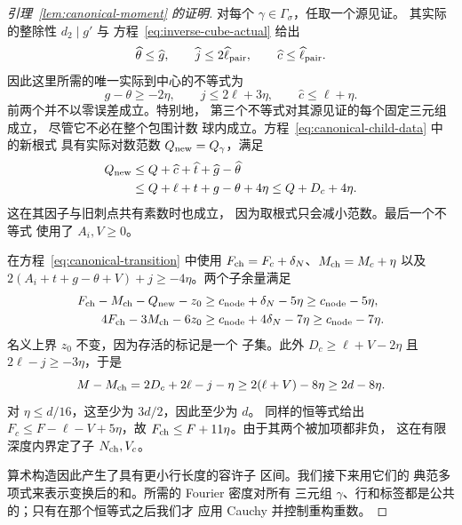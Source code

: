 \documentclass[11pt,a4paper]{article}
\numberwithin{equation}{section}
\numberwithin{figure}{section}
\theoremstyle{definition}
\theoremstyle{remark}
\begin{document}
\begin{proof}[引理~\ref{lem:canonical-moment} 的证明]
对每个 \(\gamma\in\Gamma_\sigma\)，任取一个源见证。
其实际的整除性 \(d_2\mid g'\) 与
方程~\eqref{eq:inverse-cube-actual} 给出
\[
 \widehat\theta\le\widehat g,\qquad
 \widehat j\le2\widehat\ell_{\rm pair},\qquad
 \widehat c\le\widehat\ell_{\rm pair}.
\]
因此这里所需的唯一实际到中心的不等式为
\begin{equation}\label{eq:inverse-center-inequalities}
 g-\theta\ge-2\eta,\qquad j\le2\ell+3\eta,\qquad
 \widehat c\le\ell+\eta.
\end{equation}
前两个并不以零误差成立。特别地，
第三个不等式对其源见证的每个固定三元组成立，
尽管它不必在整个包围计数
球内成立。方程~\eqref{eq:canonical-child-data} 中的新根式
具有实际对数范数 \(Q_{\rm new}=Q_\gamma\)，满足
\begin{equation}\label{eq:inverse-new-puncture}
 \begin{split}
 Q_{\rm new}&\le Q+\widehat c+\widehat t+\widehat g-\widehat\theta\\
 &\le Q+\ell+t+g-\theta+4\eta\le Q+D_c+4\eta.
 \end{split}
\end{equation}
这在其因子与旧刺点共有素数时也成立，
因为取根式只会减小范数。最后一个不等式
使用了 \(A_i,V\ge0\)。

在方程~\eqref{eq:canonical-transition} 中使用 \(F_{\rm ch}=F_c+\delta_N\)、\(M_{\rm ch}=M_c+\eta\) 以及
\(2(A_i+t+g-\theta+V)+j\ge-4\eta\)。两个子余量满足
\begin{equation}\label{eq:inverse-child-margins}
 \begin{aligned}
 F_{\rm ch}-M_{\rm ch}-Q_{\rm new}-z_0
   &\ge c_{\rm node}+\delta_N-5\eta\ge c_{\rm node}-5\eta,\\
 4F_{\rm ch}-3M_{\rm ch}-6z_0
   &\ge c_{\rm node}+4\delta_N-7\eta\ge c_{\rm node}-7\eta.
 \end{aligned}
\end{equation}
名义上界 \(z_0\) 不变，因为存活的标记是一个
子集。此外 \(D_c\ge\ell+V-2\eta\) 且
\(2\ell-j\ge-3\eta\)，于是
\begin{equation}\label{eq:inverse-row-decrease}
 M-M_{\rm ch}=2D_c+2\ell-j-\eta
       \ge2(\ell+V)-8\eta\ge2d-8\eta.
\end{equation}
对 \(\eta\le d/16\)，这至少为 \(3d/2\)，因此至少为 \(d\)。
同样的恒等式给出 \(F_c\le F-\ell-V+5\eta\)，故
\(F_{\rm ch}\le F+11\eta\)。由于其两个被加项都非负，
这在有限深度内界定了子 \(N_{\rm ch},V_c\)。

算术构造因此产生了具有更小行长度的容许子
区间。我们接下来用它们的
典范多项式来表示变换后的和。所需的 Fourier 密度对所有
三元组 \(\gamma\)、行和标签都是公共的；只有在那个恒等式之后我们才
应用 Cauchy 并控制重构重数。


\end{proof}
\end{document}

